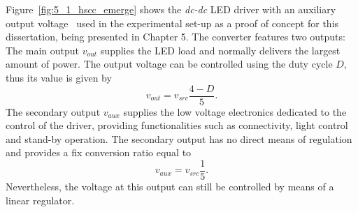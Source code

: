 Figure~\ref{fig:5_1_hscc_emerge} shows the \emph{dc-dc} LED driver with an auxiliary output voltage~\cite{WO2015/040564} used in the experimental set-up as a proof of concept for this dissertation, being presented in Chapter 5. The converter features two outputs: The main output $v_{out}$ supplies the LED load and normally delivers the largest amount of power. The output voltage can be controlled using the duty cycle $D$, thus its value is given by
\begin{equation}
v_{out} =  v_{src}  \frac{4 - D }{5}.
\label{eq:dc_dc_vout}
\end{equation}
The secondary output $v_{aux}$ supplies the low voltage electronics dedicated to the control of the driver, providing functionalities such as connectivity, light control and stand-by operation. The secondary output has no direct means of regulation and provides a fix conversion ratio equal to
\begin{equation}
v_{aux} =  v_{src} \frac{1 }{5}.
\label{eq:dc_dc_vaux}
\end{equation}
Nevertheless, the voltage at this output can still be controlled by means of a linear regulator.

